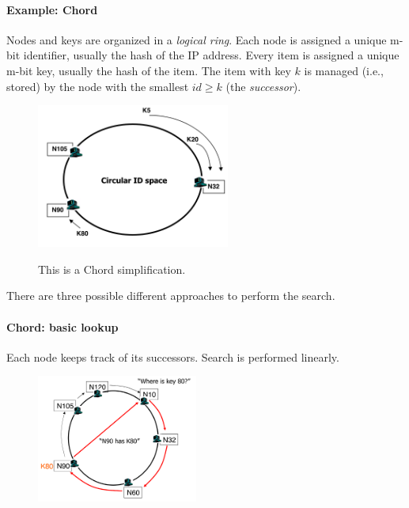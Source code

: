 \documentclass[10pt,a4paper]{article}
\begin{document}
\paragraph{Example: Chord}
Nodes and keys are organized in a \textit{logical ring}. Each node is assigned a unique m-bit identifier, usually the hash of the IP address. Every item is assigned a unique m-bit key, usually the hash of the item. The item with key $k$ is managed (i.e., stored) by the node with the smallest $id \geq k$ (the \textit{successor}).
\begin{figure}[h!]
\hfill \includegraphics[width=180pt]{images/dht-chord.png}\hspace*{\fill}
  \label{fig:dht-chord}
  \caption{This is a Chord simplification.}
\end{figure} 
\pagebreak
There are three possible different approaches to perform the search.
\paragraph{Chord: basic lookup}
Each node keeps track of its successors. Search is performed linearly.
\begin{figure}[h!]\hfill \includegraphics[width=150pt]{images/dht-chord-basic.png}\hspace*{\fill}
  \label{fig:dht-chord-basic}
\end{figure} 
\end{document}
